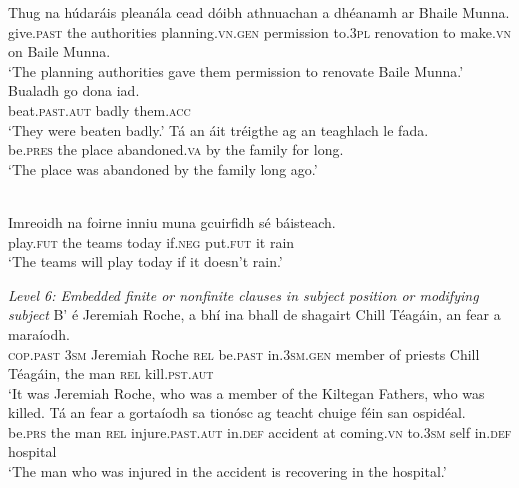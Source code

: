 \documentclass[output=paper,colorlinks,citecolor=brown]{langscibook}
\begin{document}
\ea
\gll Thug na húdaráis pleanála cead dóibh athnuachan a dhéanamh ar Bhaile Munna.\\
give.\textsc{past} the authorities planning.\textsc{vn.gen} permission to.\textsc{3pl} renovation to make.\textsc{vn} on Baile Munna.\\
\glt‘The planning authorities gave them permission to renovate Baile Munna.’
\ex
\gll Bualadh {go dona} iad.\\
beat.\textsc{past}.\textsc{aut}  badly them.\textsc{acc}\\
\glt ‘They were beaten badly.’
\ex
\gll Tá an áit tréigthe{\footnotemark} ag an teaghlach le fada.\\
be.\textsc{pres} the place abandoned.\textsc{va} by the family for long.\\
\glt‘The place was abandoned by the family long ago.’
\z
\z

\\	
\gll Imreoidh na foirne inniu muna gcuirfidh sé báisteach.\\
play.\textsc{fut} the teams today if.\textsc{neg} put.\textsc{fut} it rain\\
\glt ‘The teams will play today if it doesn't rain.’
\z
\begin{samepage}
\ea\label{ex.level6}{\textit{Level 6: Embedded finite or nonfinite clauses in subject position or modifying subject}}{\footnotemark}
\ea
\gll B' é Jeremiah Roche, a bhí ina bhall de shagairt Chill Téagáin, an fear a maraíodh.\\ 
\textsc{cop.\textsc{past}} \textsc{3sm} Jeremiah Roche \textsc{rel} be.\textsc{past} in.\textsc{3sm.gen} member of priests Chill Téagáin, the man \textsc{rel} kill.\textsc{pst.aut}\\
\glt ‘It was Jeremiah Roche, who was a member of the Kiltegan Fathers, who was killed.
\ex
\gll Tá an fear a gortaíodh sa tionósc ag teacht chuige féin san ospidéal.\\
be.\textsc{prs} the man \textsc{rel} injure.\textsc{past.aut} in.\textsc{def} accident at coming.\textsc{vn} to.\textsc{3sm} self in.\textsc{def} hospital\\
\glt ‘The man who was injured in the accident is recovering in the hospital.’
\z
\z
\end{samepage}
\end{document}
